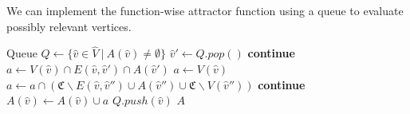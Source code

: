 We can implement the function-wise attractor function using a queue to evaluate possibly relevant vertices.
\begin{algorithm}[h]
	\caption{$\textsc{$\alpha$-FAttractor}(G, A : \hat{V} \rightarrow 2^\mathfrak{C})$}
	\begin{algorithmic}[1]
		\State Queue $Q \gets \{\hat{v} \in \hat{V} \ |\ A(\hat{v}) \neq \emptyset  \}$
		\State $\hat{v}' \gets Q.pop()$
			 \State \textbf{continue} \EndIf
				\State $a \gets V(\hat{v}) \cap E(\hat{v},\hat{v}') \cap A(\hat{v}')$
			\Else
				\State $a \gets V(\hat{v})$
					\State $a \gets a \cap (\mathfrak{C}\backslash E(\hat{v},\hat{v}'') \cup A(\hat{v}'') \cup \mathfrak{C} \backslash V(\hat{v}''))$
				\EndFor
			\EndIf
			 \State \textbf{continue} \EndIf
			\State $A(\hat{v}) \gets A(\hat{v}) \cup a$
			\State $Q.push(\hat{v})$
		\EndFor
		\EndWhile
		\State \Return $A$
	\end{algorithmic}
\end{algorithm}

